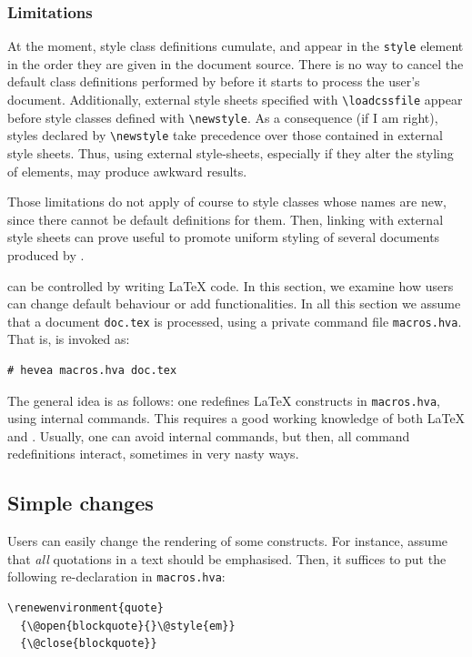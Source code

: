 \subsubsection{Limitations}
At the moment, style class definitions cumulate, and appear
in the \verb+style+ element in the order they are given in the
document source. There is no way to cancel the default class
definitions performed by \hevea{} before it starts to process the
user's document.
Additionally, external style sheets specified with \verb+\loadcssfile+
appear before style classes defined with \verb+\newstyle+.
As a consequence (if I am right), styles
declared by \verb+\newstyle+ take precedence over those contained in
external style sheets. Thus, using external style-sheets, especially
if they alter the styling of elements, may produce awkward results.

Those limitations do not apply of course to style classes whose
names are new, since there cannot be default definitions for them.
Then, linking with external style sheets can prove useful to
promote uniform styling of several documents produced by \hevea{}.


\hevea{} can be controlled by writing \LaTeX{} code. In this section,
we examine how users can change \hevea{} default behaviour or add
functionalities. In all this section we assume that a document
\texttt{doc.tex} is processed, using a private command file
\texttt{macros.hva}. That is, \hevea{} is invoked as:
\begin{verbatim}
# hevea macros.hva doc.tex
\end{verbatim}
The general idea is as follows: one redefines \LaTeX{} constructs in
\texttt{macros.hva}, using internal commands. This requires a good
working knowledge of both \LaTeX{} and \html.
Usually, one can avoid internal commands, but then, all command
redefinitions interact, sometimes in very nasty ways.


\subsection{Simple changes}
Users can easily change the rendering of some constructs. For
instance, assume that \emph{all} quotations in a text should be
emphasised. Then, it suffices to put the following re-declaration in
\texttt{macros.hva}:
\begin{verbatim}
\renewenvironment{quote}
  {\@open{blockquote}{}\@style{em}}
  {\@close{blockquote}}
\end{verbatim}

